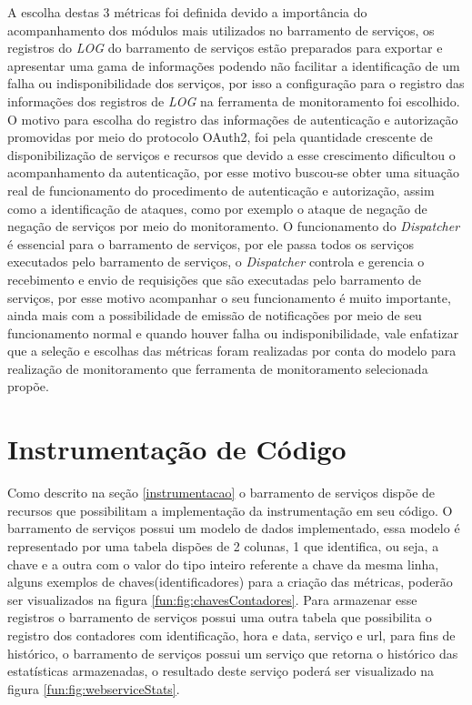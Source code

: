 A escolha destas 3 métricas foi definida devido a importância do acompanhamento dos módulos mais utilizados no barramento de serviços, os registros do \textit{LOG} do barramento de serviços estão preparados para exportar e apresentar uma gama de informações podendo não facilitar a identificação de um falha ou indisponibilidade dos serviços, por isso a configuração para o registro das informações dos registros de \textit{LOG} na ferramenta de monitoramento foi escolhido. O motivo para escolha do registro das informações de autenticação e autorização promovidas por meio do protocolo OAuth2, foi pela quantidade crescente de disponibilização de serviços e recursos que devido a esse crescimento dificultou o acompanhamento da autenticação, por esse motivo buscou-se obter uma situação real de funcionamento do procedimento de autenticação e autorização, assim como a identificação de ataques, como por exemplo o ataque de negação de negação de serviços por meio do monitoramento. O funcionamento do \textit{Dispatcher} é essencial para o barramento de serviços, por ele passa todos os serviços executados pelo barramento de serviços, o \textit{Dispatcher} controla e gerencia o recebimento e envio de requisições que são executadas pelo barramento de serviços, por esse motivo acompanhar o seu funcionamento é muito importante, ainda mais com a possibilidade de emissão de notificações por meio de seu funcionamento normal e quando houver falha ou indisponibilidade, vale enfatizar que a seleção e escolhas das métricas foram realizadas por conta do modelo para realização de monitoramento que ferramenta de monitoramento selecionada propõe.   


\section{Instrumentação de Código}
\label{instrumentacaoErlangms}

Como descrito na seção \ref{instrumentacao} o barramento de serviços dispõe de recursos que possibilitam a implementação da instrumentação em seu código. O barramento de serviços possui  um modelo de dados implementado, essa modelo é representado por uma tabela dispões de 2 colunas, 1 que identifica, ou seja, a chave e a outra com o valor do tipo inteiro referente a chave da mesma linha, alguns exemplos de chaves(identificadores) para a criação das métricas, poderão ser visualizados na figura \ref{fun:fig:chavesContadores}. Para armazenar esse registros o barramento de serviços possui uma outra tabela que possibilita o registro dos contadores com identificação, hora e data, serviço e url, para fins de histórico, o barramento de serviços possui um serviço que retorna o histórico das estatísticas armazenadas, o resultado deste serviço poderá ser visualizado na figura \ref{fun:fig:webserviceStats}. 

